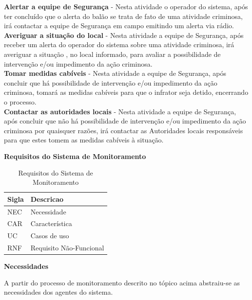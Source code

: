 \textbf{Alertar a equipe de Segurança} - Nesta atividade o operador do sistema, após ter concluído que o alerta do balão se trata de fato de uma atividade criminosa, irá contactar a equipe de Segurança em campo emitindo um alerta via rádio.
\\

\textbf{Averiguar a situação do local} - Nesta atividade a equipe de Segurança, após receber um alerta do operador do sistema sobre uma atividade criminosa, irá averiguar a situação , no local informado, para avaliar a possibilidade de intervenção e/ou impedimento da ação criminosa.
\\

\textbf{Tomar medidas cabíveis} - Nesta atividade a equipe de Segurança, após concluir que há possibilidade de intervenção e/ou impedimento da ação criminosa, tomará as medidas cabíveis para que o infrator seja detido, encerrando o processo.
\\

\textbf{Contactar as autoridades locais} - Nesta atividade a equipe de Segurança, após concluir que não há possibilidade de intervenção e/ou impedimento da ação criminosa por quaisquer razões, irá contactar as Autoridades locais responsáveis para que estes tomem as medidas cabíveis à situação.
\\
\par
\textbf{Requisitos do Sistema de Monitoramento}
\begin{table}[H]
\centering
\begin{tabular}{|l|l|}
\hline
\textbf{Sigla}        & \textbf{Descricao} \\ \hline
NEC     & Necessidade                      \\ \hline
CAR   	& Característica				   \\ \hline
UC  	& Casos de uso                     \\ \hline
RNF 	& Requisito Não-Funcional          \\ \hline

\end{tabular}
\caption{Requisitos do Sistema de Monitoramento}
\label{Requisitos do Sistema de Monitoramento}
\end{table}

\textbf{Necessidades}
\par
A partir do processo de monitoramento descrito no tópico acima abstraiu-se as necessidades dos agentes do sistema.

